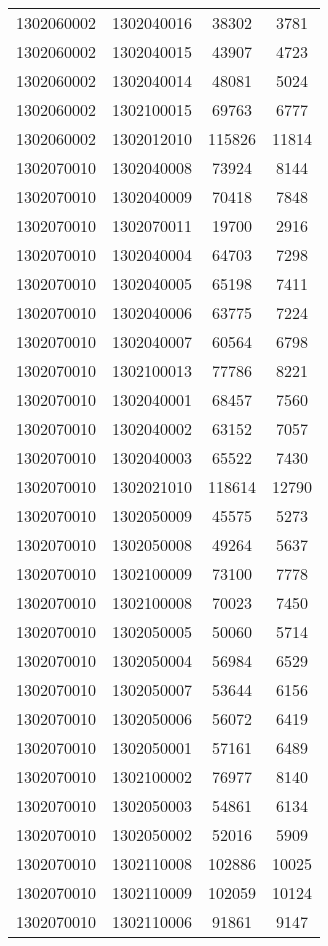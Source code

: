 \begin{longtable}{llcc}
1302060002 & 1302040016 & 38302 & 3781\\
1302060002 & 1302040015 & 43907 & 4723\\
1302060002 & 1302040014 & 48081 & 5024\\
1302060002 & 1302100015 & 69763 & 6777\\
1302060002 & 1302012010 & 115826 & 11814\\
1302070010 & 1302040008 & 73924 & 8144\\
1302070010 & 1302040009 & 70418 & 7848\\
1302070010 & 1302070011 & 19700 & 2916\\
1302070010 & 1302040004 & 64703 & 7298\\
1302070010 & 1302040005 & 65198 & 7411\\
1302070010 & 1302040006 & 63775 & 7224\\
1302070010 & 1302040007 & 60564 & 6798\\
1302070010 & 1302100013 & 77786 & 8221\\
1302070010 & 1302040001 & 68457 & 7560\\
1302070010 & 1302040002 & 63152 & 7057\\
1302070010 & 1302040003 & 65522 & 7430\\
1302070010 & 1302021010 & 118614 & 12790\\
1302070010 & 1302050009 & 45575 & 5273\\
1302070010 & 1302050008 & 49264 & 5637\\
1302070010 & 1302100009 & 73100 & 7778\\
1302070010 & 1302100008 & 70023 & 7450\\
1302070010 & 1302050005 & 50060 & 5714\\
1302070010 & 1302050004 & 56984 & 6529\\
1302070010 & 1302050007 & 53644 & 6156\\
1302070010 & 1302050006 & 56072 & 6419\\
1302070010 & 1302050001 & 57161 & 6489\\
1302070010 & 1302100002 & 76977 & 8140\\
1302070010 & 1302050003 & 54861 & 6134\\
1302070010 & 1302050002 & 52016 & 5909\\
1302070010 & 1302110008 & 102886 & 10025\\
1302070010 & 1302110009 & 102059 & 10124\\
1302070010 & 1302110006 & 91861 & 9147\\

\end{longtable}
